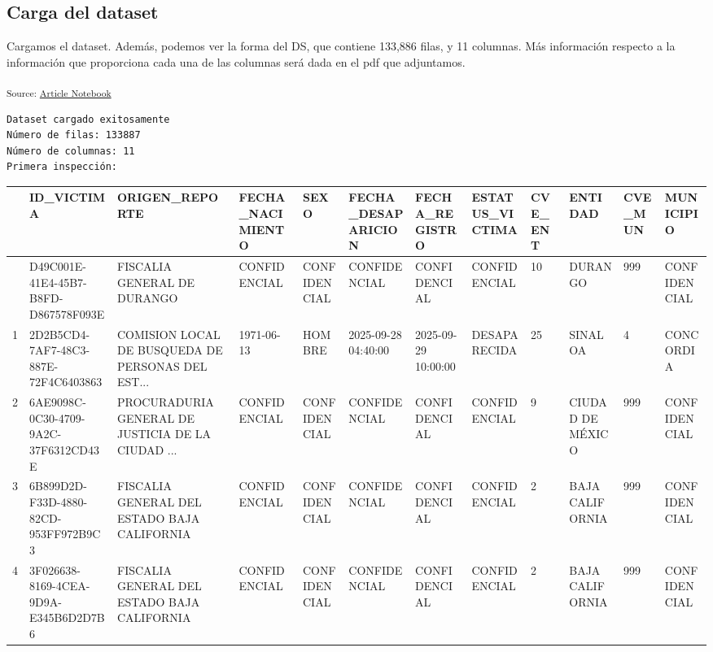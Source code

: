 \documentclass[
]{agujournal2019}
\newcounter{none} %
\begin{document}
\subsection{Carga del dataset}\label{carga-del-dataset}

Cargamos el dataset. Además, podemos ver la forma del DS, que contiene
133,886 filas, y 11 columnas. Más información respecto a la información
que proporciona cada una de las columnas será dada en el pdf que
adjuntamos.

\textsubscript{Source:
\href{https://Rou-uu.github.io/pruebaQuarto/index.qmd.html}{Article
Notebook}}

\begin{verbatim}
Dataset cargado exitosamente
Número de filas: 133887
Número de columnas: 11
Primera inspección: 
\end{verbatim}

{\def\LTcaptype{none} %
\begin{longtable}[]{@{}llllllllllll@{}}
\toprule\noalign{}
& ID\_VICTIMA & ORIGEN\_REPORTE & FECHA\_NACIMIENTO & SEXO &
FECHA\_DESAPARICION & FECHA\_REGISTRO & ESTATUS\_VICTIMA & CVE\_ENT &
ENTIDAD & CVE\_MUN & MUNICIPIO \\
\midrule\noalign{}
\endhead
\bottomrule\noalign{}
\endlastfoot
0 & D49C001E-41E4-45B7-B8FD-D867578F093E & FISCALIA GENERAL DE DURANGO &
CONFIDENCIAL & CONFIDENCIAL & CONFIDENCIAL & CONFIDENCIAL & CONFIDENCIAL
& 10 & DURANGO & 999 & CONFIDENCIAL \\
1 & 2D2B5CD4-7AF7-48C3-887E-72F4C6403863 & COMISION LOCAL DE BUSQUEDA DE
PERSONAS DEL EST... & 1971-06-13 & HOMBRE & 2025-09-28 04:40:00 &
2025-09-29 10:00:00 & DESAPARECIDA & 25 & SINALOA & 4 & CONCORDIA \\
2 & 6AE9098C-0C30-4709-9A2C-37F6312CD43E & PROCURADURIA GENERAL DE
JUSTICIA DE LA CIUDAD ... & CONFIDENCIAL & CONFIDENCIAL & CONFIDENCIAL &
CONFIDENCIAL & CONFIDENCIAL & 9 & CIUDAD DE MÉXICO & 999 &
CONFIDENCIAL \\
3 & 6B899D2D-F33D-4880-82CD-953FF972B9C3 & FISCALIA GENERAL DEL ESTADO
BAJA CALIFORNIA & CONFIDENCIAL & CONFIDENCIAL & CONFIDENCIAL &
CONFIDENCIAL & CONFIDENCIAL & 2 & BAJA CALIFORNIA & 999 &
CONFIDENCIAL \\
4 & 3F026638-8169-4CEA-9D9A-E345B6D2D7B6 & FISCALIA GENERAL DEL ESTADO
BAJA CALIFORNIA & CONFIDENCIAL & CONFIDENCIAL & CONFIDENCIAL &
CONFIDENCIAL & CONFIDENCIAL & 2 & BAJA CALIFORNIA & 999 &
CONFIDENCIAL \\
\end{longtable}
}
\end{document}
